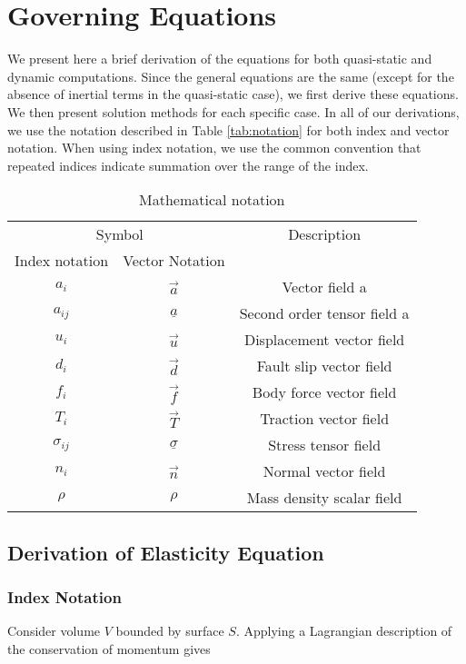 \chapter{Governing Equations}
\label{cha:governing:equations}

We present here a brief derivation of the equations for both quasi-static
and dynamic computations. Since the general equations are the same
(except for the absence of inertial terms in the quasi-static case),
we first derive these equations. We then present solution methods
for each specific case. In all of our derivations, we use the notation
described in Table \vref{tab:notation} for both index
and vector notation. When using index notation, we use the common
convention that repeated indices indicate summation over the range
of the index.

\begin{table}[htbp]
\caption{Mathematical notation}
\label{tab:notation}

\begin{tabular}{|c|c|c|}
\hline 
\multicolumn{2}{|c|}{Symbol} & Description\tabularnewline
\cline{1-2} 
Index notation & Vector Notation & \tabularnewline
\hline 
\hline 
$a_{i}$ & $\overrightarrow{a}$ & Vector field a\tabularnewline
\hline 
$a_{ij}$ & $\underline{a}$ & Second order tensor field a\tabularnewline
\hline 
$u_{i}$ & $\overrightarrow{u}$ & Displacement vector field\tabularnewline
\hline 
$d_{i}$ & $\vec{{d}}$ & Fault slip vector field\tabularnewline
\hline 
$f_{i}$ & $\overrightarrow{f}$ & Body force vector field\tabularnewline
\hline 
$T_{i}$ & $\overrightarrow{T}$ & Traction vector field\tabularnewline
\hline 
$\sigma_{ij}$ & $\underline{\sigma}$ & Stress tensor field\tabularnewline
\hline 
$n_{i}$ & $\overrightarrow{n}$ & Normal vector field\tabularnewline
\hline 
$\rho$ & $\rho$ & Mass density scalar field\tabularnewline
\hline 
\end{tabular}
\end{table}


\section{Derivation of Elasticity Equation}


\subsection{Index Notation}

Consider volume $V$ bounded by surface $S$. Applying a Lagrangian
description of the conservation of momentum gives


